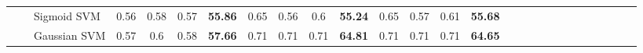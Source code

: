 \documentclass[sn-mathphys]{sn-jnl}%
\theoremstyle{thmstyleone}%
\theoremstyle{thmstyletwo}%
\theoremstyle{thmstylethree}%
\begin{document}
\begin{table*}[hbt!]
{\begin{tabular}{lllcccccccccccccccccccccccc}
\multicolumn{1}{|l|}{}                                  & \multicolumn{1}{l|}{}                                                                                        & \multicolumn{1}{l|}{Sigmoid SVM}                          & \multicolumn{1}{c|}{0.56}               & \multicolumn{1}{c|}{0.58}            & \multicolumn{1}{c|}{0.57}              & \multicolumn{1}{c|}{\textbf{55.86}}                                                   & \multicolumn{1}{c|}{0.65}               & \multicolumn{1}{c|}{0.56}            & \multicolumn{1}{c|}{0.6}               & \multicolumn{1}{c|}{\textbf{55.24}}                                                   & \multicolumn{1}{c|}{0.65}               & \multicolumn{1}{c|}{0.57}            & \multicolumn{1}{c|}{0.61}              & \multicolumn{1}{c|}{\textbf{55.68}}                                                   &                      &                      &                      &                      &                      &                      &                      &                      &                      &                      &                      &                      \\ \cline{3-15}
\multicolumn{1}{|l|}{}                                  & \multicolumn{1}{l|}{}                                                                                        & \multicolumn{1}{l|}{Gaussian SVM}                         & \multicolumn{1}{c|}{0.57}               & \multicolumn{1}{c|}{0.6}             & \multicolumn{1}{c|}{0.58}              & \multicolumn{1}{c|}{\textbf{57.66}}                                                   & \multicolumn{1}{c|}{0.71}               & \multicolumn{1}{c|}{0.71}            & \multicolumn{1}{c|}{0.71}              & \multicolumn{1}{c|}{\textbf{64.81}}                                                   & \multicolumn{1}{c|}{0.71}               & \multicolumn{1}{c|}{0.71}            & \multicolumn{1}{c|}{0.71}              & \multicolumn{1}{c|}{\textbf{64.65}}                                                   &                      &                      &                      &                      &                      &                      &                      &                      &                      &                      &                      &                      \\ \cline{3-15}

\end{tabular}}
\end{table*}
\end{document}
